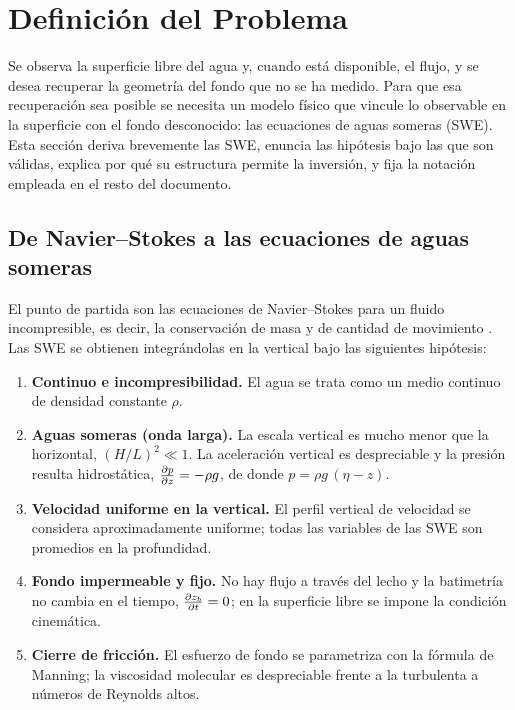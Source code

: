 \section{Definición del Problema}
\label{sec:problema}

Se observa la superficie libre del agua y, cuando está disponible, el flujo, y
se desea recuperar la geometría del fondo que no se ha medido. Para que esa
recuperación sea posible se necesita un modelo físico que vincule lo observable
en la superficie con el fondo desconocido: las ecuaciones de aguas someras
(SWE). Esta sección deriva brevemente las SWE, enuncia las hipótesis bajo las
que son válidas, explica por qué su estructura permite la inversión, y fija la
notación empleada en el resto del documento.

\subsection{De Navier--Stokes a las ecuaciones de aguas someras}

El punto de partida son las ecuaciones de Navier--Stokes para un fluido
incompresible, es decir, la conservación de masa y de cantidad de movimiento
\cite{vreugdenhil1994, vallis2017}. Las SWE se obtienen integrándolas en la
vertical bajo las siguientes hipótesis:

\begin{enumerate}
  \item \textbf{Continuo e incompresibilidad.} El agua se trata como un medio
        continuo de densidad constante $\rho$.
  \item \textbf{Aguas someras (onda larga).} La escala vertical es mucho menor
        que la horizontal, $(H/L)^2 \ll 1$. La aceleración vertical es
        despreciable y la presión resulta hidrostática, $\frac{\partial p}{\partial z} = -\rho g$,
        de donde $p = \rho g\,(\eta - z)$.
  \item \textbf{Velocidad uniforme en la vertical.} El perfil vertical de
        velocidad se considera aproximadamente uniforme; todas las variables de
        las SWE son promedios en la profundidad.
  \item \textbf{Fondo impermeable y fijo.} No hay flujo a través del lecho y la
        batimetría no cambia en el tiempo, $\frac{\partial z_b}{\partial t} = 0$; en la superficie
        libre se impone la condición cinemática.
  \item \textbf{Cierre de fricción.} El esfuerzo de fondo se parametriza con la
        fórmula de Manning; la viscosidad molecular es despreciable frente a la
        turbulenta a números de Reynolds altos.
\end{enumerate}

